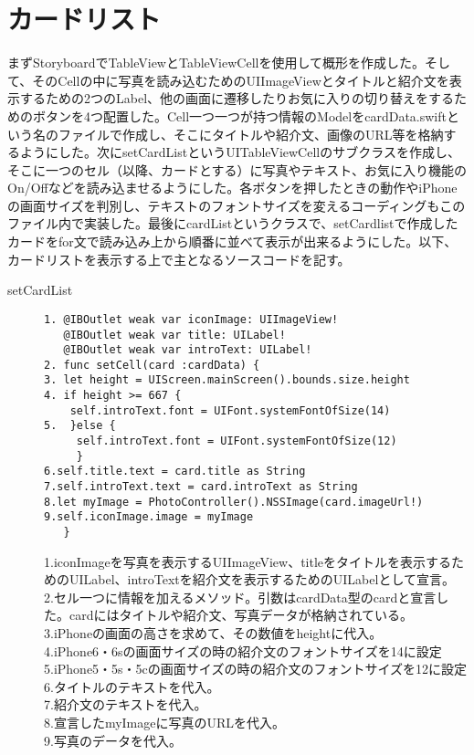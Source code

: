 \section{カードリスト}
まずStoryboardでTableViewとTableViewCellを使用して概形を作成した。そして、そのCellの中に写真を読み込むためのUIImageViewとタイトルと紹介文を表示するための2つのLabel、他の画面に遷移したりお気に入りの切り替えをするためのボタンを4つ配置した。Cell一つ一つが持つ情報のModelをcardData.swiftという名のファイルで作成し、そこにタイトルや紹介文、画像のURL等を格納するようにした。次にsetCardListというUITableViewCellのサブクラスを作成し、そこに一つのセル（以降、カードとする）に写真やテキスト、お気に入り機能のOn/Offなどを読み込ませるようにした。各ボタンを押したときの動作やiPhoneの画面サイズを判別し、テキストのフォントサイズを変えるコーディングもこのファイル内で実装した。最後にcardListというクラスで、setCardlistで作成したカードをfor文で読み込み上から順番に並べて表示が出来るようにした。以下、カードリストを表示する上で主となるソースコードを記す。

\begin{description}
\item[setCardList]\mbox{} 
\begin{lstlisting}[basicstyle=\ttfamily\footnotesize, frame=single]
1. @IBOutlet weak var iconImage: UIImageView!
   @IBOutlet weak var title: UILabel!
   @IBOutlet weak var introText: UILabel!
2. func setCell(card :cardData) {
3. let height = UIScreen.mainScreen().bounds.size.height
4. if height >= 667 {
    self.introText.font = UIFont.systemFontOfSize(14)
5.  }else {
     self.introText.font = UIFont.systemFontOfSize(12)
     }
6.self.title.text = card.title as String
7.self.introText.text = card.introText as String
8.let myImage = PhotoController().NSSImage(card.imageUrl!)
9.self.iconImage.image = myImage
   }
 \end{lstlisting}

1.iconImageを写真を表示するUIImageView、titleをタイトルを表示するためのUILabel、introTextを紹介文を表示するためのUILabelとして宣言。\\
2.セル一つに情報を加えるメソッド。引数はcardData型のcardと宣言した。cardにはタイトルや紹介文、写真データが格納されている。\\
3.iPhoneの画面の高さを求めて、その数値をheightに代入。\\
4.iPhone6・6sの画面サイズの時の紹介文のフォントサイズを14に設定 \\
5.iPhone5・5s・5cの画面サイズの時の紹介文のフォントサイズを12に設定 \\
6.タイトルのテキストを代入。 \\
7.紹介文のテキストを代入。 \\
8.宣言したmyImageに写真のURLを代入。 \\
9.写真のデータを代入。 \\
\end{description}


